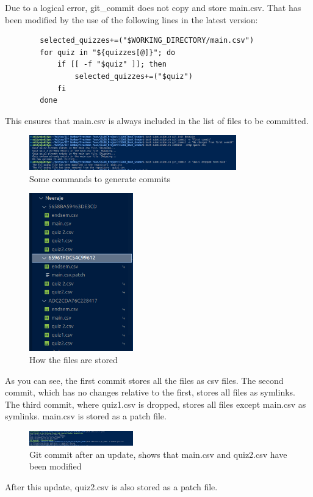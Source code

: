 \documentclass{article}
\begin{document}
    Due to a logical error, git\_commit does not copy and store main.csv. That has been modified by the use of the following lines in the latest version:
    \begin{lstlisting}
        selected_quizzes+=("$WORKING_DIRECTORY/main.csv")
        for quiz in "${quizzes[@]}"; do
            if [[ -f "$quiz" ]]; then
                selected_quizzes+=("$quiz")
            fi
        done    
    \end{lstlisting}
    This ensures that main.csv is always included in the list of files to be committed.\\
    \begin{figure}[htbp]
        \centering
        \includegraphics[width=0.8\textwidth]{Git Commit history.png}
        \caption{Some commands to generate commits}
        \label{fig:first_commit}
    \end{figure}
    \begin{figure}[htbp]
        \centering
        \includegraphics[width=0.4\textwidth]{How Files are Stored.png}
        \caption{How the files are stored}
        \label{fig:second_commit}
    \end{figure}
    As you can see, the first commit stores all the files as csv files. The second commit, which has no changes relative to the first, stores all files as symlinks. The third commit, where quiz1.csv is dropped, stores all files except main.csv as symlinks. main.csv is stored as a patch file.\\
    \begin{figure}[htbp]
        \centering
        \includegraphics[width=0.4\textwidth]{Git Commit after an update.png}
        \caption{Git commit after an update, shows that main.csv and quiz2.csv have been modified}
        \label{fig:third_commit}
    \end{figure}
    After this update, quiz2.csv is also stored as a patch file.
\end{document}
